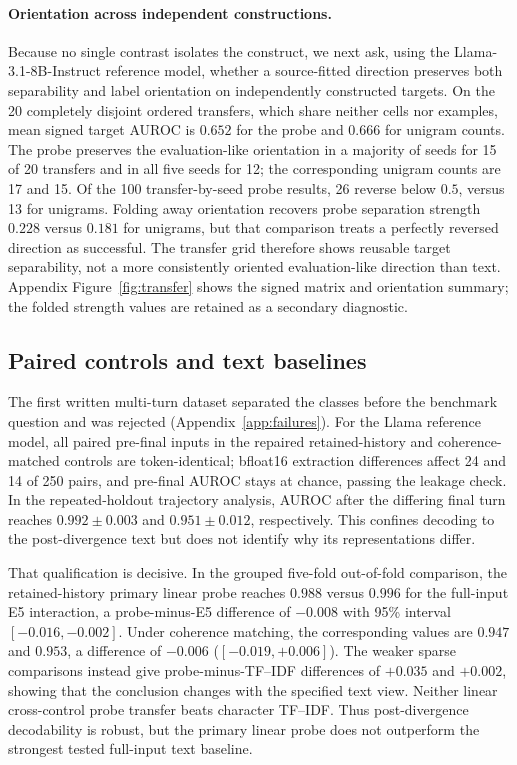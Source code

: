 \documentclass{article}
\begin{document}
\paragraph{Orientation across independent constructions.}

Because no single contrast isolates the construct, we next ask, using the
Llama-3.1-8B-Instruct reference model, whether a source-fitted direction
preserves both separability and label orientation on
independently constructed targets. On the 20 completely disjoint ordered
transfers, which share neither cells nor examples, mean signed target AUROC is
$0.652$ for the probe and $0.666$ for unigram counts. The probe preserves the
evaluation-like orientation in a majority of seeds for 15 of 20 transfers and
in all five seeds for 12; the corresponding unigram counts are 17 and 15. Of
the 100 transfer-by-seed probe results, 26 reverse below $0.5$, versus 13 for
unigrams. Folding away orientation recovers probe separation strength $0.228$
versus $0.181$ for unigrams, but that comparison treats a perfectly reversed
direction as successful. The transfer grid therefore shows reusable target
separability, not a more consistently oriented evaluation-like direction than
text. Appendix Figure~\ref{fig:transfer} shows the signed matrix and orientation
summary; the folded strength values are retained as a secondary
diagnostic.

\subsection{Paired controls and text baselines}

The first written multi-turn dataset separated the classes before the benchmark
question and was rejected (Appendix~\ref{app:failures}). For the Llama reference
model, all paired pre-final inputs in the repaired retained-history and
coherence-matched controls are token-identical; bfloat16 extraction differences
affect 24 and 14 of 250 pairs, and pre-final AUROC stays at chance, passing the
leakage check. In the
repeated-holdout trajectory analysis, AUROC after the differing final turn
reaches $0.992\mathbin{\pm}0.003$ and $0.951\mathbin{\pm}0.012$,
respectively. This confines decoding to the post-divergence text but does not
identify why its representations differ.

That qualification is decisive. In the grouped five-fold out-of-fold
comparison, the retained-history primary linear probe reaches $0.988$ versus
$0.996$ for the full-input E5 interaction, a probe-minus-E5 difference of
$-0.008$ with 95\% interval
$[-0.016,-0.002]$. Under coherence matching, the corresponding values are
$0.947$ and $0.953$, a difference of $-0.006$
($[-0.019,+0.006]$). The weaker sparse comparisons instead give
probe-minus-TF--IDF differences of $+0.035$ and $+0.002$, showing that the
conclusion changes with the specified text view. Neither linear cross-control
probe transfer beats character TF--IDF. Thus post-divergence decodability is
robust, but the primary linear probe does not outperform the strongest tested
full-input text baseline.
\end{document}
